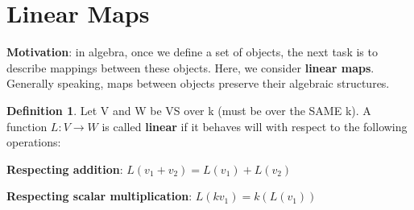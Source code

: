\documentclass[a4paper, 12pt]{article}
\theoremstyle{definition}
\theoremstyle{definition}
\newtheorem{defn}{Definition}[section]
\theoremstyle{definition}
\theoremstyle{definition}
\newenvironment{enumerate_tight}{
	\begin{enumerate}
		\setlength{\itemsep}{0pt}
		\setlength{\parskip}{0pt}
	}{\end{enumerate}}
\begin{document}
{\section{Linear Maps}
\textbf{Motivation}: in algebra, once we define a set of objects, the next task is to describe mappings between these objects. Here, we consider \textbf{linear maps}. Generally speaking, maps between objects preserve their algebraic structures. 
\begin{defn}
	Let V and W be VS over k (must be over the SAME k). A function $L : V \rightarrow W$ is called \textbf{linear} if it behaves will with respect to the following operations: 
	\begin{enumerate_tight}
		\item \textbf{Respecting addition}: $L (v_1 + v_2) = L(v_1) + L(v_2)$ 
		\item \textbf{Respecting scalar multiplication}: $L(kv_1) = k(L(v_1))$
	\end{enumerate_tight}
\end{defn}

}
\end{document}
